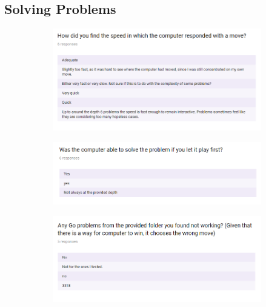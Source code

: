\documentclass{l4proj}
\begin{document}
\begin{appendices}
\section{Solving Problems}

\begin{figure}[H]
\centering
\begin{subfigure}[b]{\textwidth}
\centering
\includegraphics[width=\textwidth]{A1-2/1.png}
\end{subfigure}
\end{figure}

\begin{figure}[H]
\centering
\begin{subfigure}[b]{\textwidth}
\centering
\includegraphics[width=\textwidth]{A1-2/2.png}
\end{subfigure}
\end{figure}



\begin{figure}[H]
\centering
\begin{subfigure}[b]{\textwidth}
\centering
\includegraphics[width=\textwidth]{A1-2/3.png}
\end{subfigure}
\end{figure}


\end{appendices}
\end{document}
